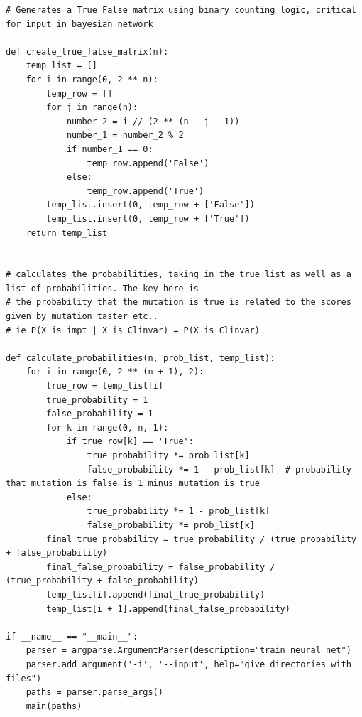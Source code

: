 \documentclass{article}
\begin{document}
\begin{verbatim}
# Generates a True False matrix using binary counting logic, critical for input in bayesian network

def create_true_false_matrix(n):
    temp_list = []
    for i in range(0, 2 ** n):
        temp_row = []
        for j in range(n):
            number_2 = i // (2 ** (n - j - 1))
            number_1 = number_2 % 2
            if number_1 == 0:
                temp_row.append('False')
            else:
                temp_row.append('True')
        temp_list.insert(0, temp_row + ['False'])
        temp_list.insert(0, temp_row + ['True'])
    return temp_list


# calculates the probabilities, taking in the true list as well as a list of probabilities. The key here is
# the probability that the mutation is true is related to the scores given by mutation taster etc..
# ie P(X is impt | X is Clinvar) = P(X is Clinvar)

def calculate_probabilities(n, prob_list, temp_list):
    for i in range(0, 2 ** (n + 1), 2):
        true_row = temp_list[i]
        true_probability = 1
        false_probability = 1
        for k in range(0, n, 1):
            if true_row[k] == 'True':
                true_probability *= prob_list[k]
                false_probability *= 1 - prob_list[k]  # probability that mutation is false is 1 minus mutation is true
            else:
                true_probability *= 1 - prob_list[k]
                false_probability *= prob_list[k]
        final_true_probability = true_probability / (true_probability + false_probability)
        final_false_probability = false_probability / (true_probability + false_probability)
        temp_list[i].append(final_true_probability)
        temp_list[i + 1].append(final_false_probability)

if __name__ == "__main__":
    parser = argparse.ArgumentParser(description="train neural net")
    parser.add_argument('-i', '--input', help="give directories with files")
    paths = parser.parse_args()
    main(paths)
\end{verbatim}
\end{document}
